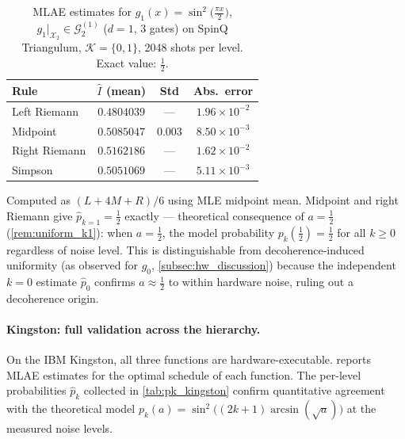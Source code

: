\documentclass[12pt,a4paper]{article}
\theoremstyle{plain}
\theoremstyle{definition}
\theoremstyle{remark}
\newcommand{\Gclass}[2]{\mathcal{G}_{#1}^{(#2)}}
\begin{document}
\begin{table}[h]
\centering
\caption{MLAE estimates for
  $g_1(x)=\sin^2\!\bigl(\tfrac{\pi x}{2}\bigr)$, $g_1|_{\mathcal{X}_2}\in\Gclass{2}{1}$
  ($d=1$, 3 gates) on SpinQ Triangulum, $\mathcal{K}=\{0,1\}$,
  2048 shots per level. Exact value: $\tfrac{1}{2}$.}
\label{tab:results_g1_hw}
\begin{threeparttable}
\renewcommand{\arraystretch}{1.3}
\begin{tabular}{lccc}
\toprule
Rule & $\hat{I}$ (mean) & Std & Abs.\ error \\
\midrule
Left Riemann    & $0.4804039$ & ---     & $1.96\times10^{-2}$ \\
Midpoint        & $0.5085047$ & $0.003$ & $8.50\times10^{-3}$ \\
Right Riemann   & $0.5162186$ & ---     & $1.62\times10^{-2}$ \\
Simpson         & $0.5051069$ & ---     & $5.11\times10^{-3}$\tnote{a} \\
\bottomrule
\end{tabular}
\begin{tablenotes}
\footnotesize
\item[a] Computed as $(L+4M+R)/6$ using MLE midpoint mean.
  Midpoint and right Riemann give $\hat{p}_{k=1}=\tfrac{1}{2}$
  exactly — theoretical consequence of $a=\tfrac{1}{2}$
  (\cref{rem:uniform_k1}): when $a=\tfrac{1}{2}$, the model
  probability $p_k(\tfrac{1}{2})=\tfrac{1}{2}$ for all $k\geq 0$
  regardless of noise level.
  This is distinguishable from decoherence-induced uniformity
  (as observed for $g_0$, \cref{subsec:hw_discussion}) because the
  independent $k=0$ estimate $\hat{p}_0$ confirms $a\approx\tfrac{1}{2}$
  to within hardware noise, ruling out a decoherence origin.
\end{tablenotes}
\end{threeparttable}
\end{table}

\paragraph{Kingston: full validation across the hierarchy.}
On the IBM Kingston, all three functions are hardware-executable.
 reports MLAE estimates for the
optimal schedule of each function.
The per-level probabilities $\hat{p}_k$ collected in
\cref{tab:pk_kingston} confirm quantitative agreement with
the theoretical model $p_k(a)=\sin^2\bigl((2k+1)\arcsin(\sqrt{a})\bigr)$
at the measured noise levels.
\end{document}
